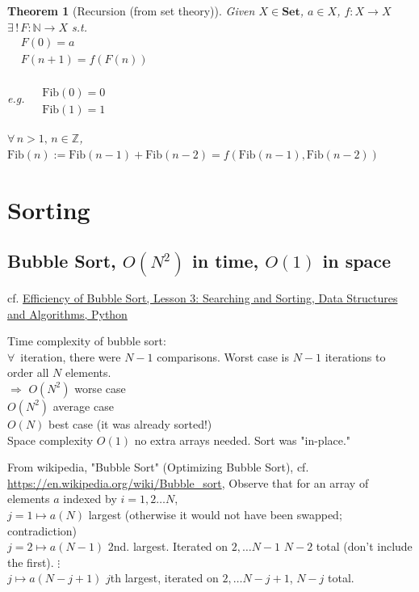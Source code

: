 \documentclass[10pt]{amsart}
\newtheorem{theorem}{Theorem}
\begin{document}
\begin{theorem}[Recursion (from set theory)]
	Given $X \in \textbf{Set}$, $a\in X$, $f:X \to X$ \\
	$\exists \, ! \, F: \mathbb{N} \to X$ s.t. \\
	$\begin{aligned}
	& F(0) = a \\
	& F(n+1) = f(F(n))
	\end{aligned}$
	
	e.g. $\begin{aligned} & \quad \\ 
	& \text{Fib}(0) = 0  \\
	& \text{Fib}(1) = 1 \end{aligned}$ 
	
	$\forall \, n > 1, \, n \in \mathbb{Z}$, $\text{Fib}(n) := \text{Fib}(n-1) + \text{Fib}(n-2) = f(\text{Fib}(n-1), \text{Fib}(n-2))$
\end{theorem} 



\section{Sorting}

\subsection{Bubble Sort, $O(N^2)$ in time, $O(1)$ in space}

cf. \href{https://classroom.udacity.com/courses/ud513/lessons/7123524086/concepts/71191848070923}{Efficiency of Bubble Sort, Lesson 3: Searching and Sorting, Data Structures and Algorithms, Python}

Time complexity of bubble sort: \\
$\forall \, $ iteration, there were $N-1$ comparisons. Worst case is $N - 1$ iterations to order all $N$ elements. \\
$\Longrightarrow $ $O(N^2)$ worse case \\
\phantom{$\Longrightarrow$} $O(N^2)$ average case \\
\phantom{$\Longrightarrow$} $O(N)$ best case (it was already sorted!) \\

Space complexity $O(1)$ no extra arrays needed. Sort was "in-place."

From wikipedia, "Bubble Sort" (Optimizing Bubble Sort), cf. \url{https://en.wikipedia.org/wiki/Bubble_sort}, Observe that for an array of elements $a$ indexed by $i = 1, 2 \dots N$,  \\
$j = 1 \mapsto a(N) $ largest (otherwise it would not have been swapped; contradiction) \\
$j = 2 \mapsto a(N-1)$ 2nd. largest. Iterated on $ 2, \dots N-1$ $N-2$ total (don't include the first).
$ \vdots$ \\
$ j \mapsto a(N-j +1)$ $j$th largest, iterated on $2, \dots N- j +1$, $N-j$ total.
\end{document}
